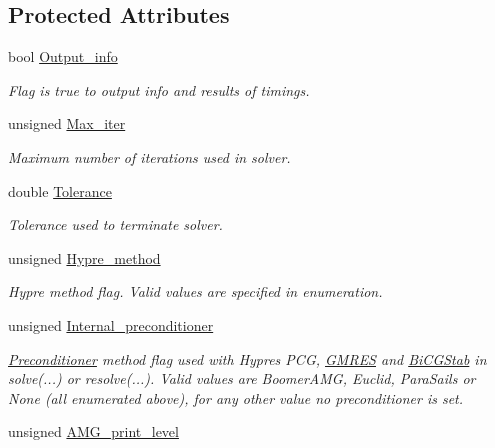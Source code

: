 \subsection*{Protected Attributes}
\begin{DoxyCompactItemize}
\item 
bool \hyperlink{classoomph_1_1HypreInterface_a011667f822e82fc40fde8ab5f2bd4d57}{Output\+\_\+info}
\begin{DoxyCompactList}\small\item\em Flag is true to output info and results of timings. \end{DoxyCompactList}\item 
unsigned \hyperlink{classoomph_1_1HypreInterface_abca9f624ee43955c6607a62b50128614}{Max\+\_\+iter}
\begin{DoxyCompactList}\small\item\em Maximum number of iterations used in solver. \end{DoxyCompactList}\item 
double \hyperlink{classoomph_1_1HypreInterface_aa32a993d324c6b198726064299a4e924}{Tolerance}
\begin{DoxyCompactList}\small\item\em Tolerance used to terminate solver. \end{DoxyCompactList}\item 
unsigned \hyperlink{classoomph_1_1HypreInterface_ae2a79282191b4430ef6631df9fc8c947}{Hypre\+\_\+method}
\begin{DoxyCompactList}\small\item\em Hypre method flag. Valid values are specified in enumeration. \end{DoxyCompactList}\item 
unsigned \hyperlink{classoomph_1_1HypreInterface_a5694f23f49b16ca978e6bcb629c7ab27}{Internal\+\_\+preconditioner}
\begin{DoxyCompactList}\small\item\em \hyperlink{classoomph_1_1Preconditioner}{Preconditioner} method flag used with Hypre\textquotesingle{}s P\+CG, \hyperlink{classoomph_1_1GMRES}{G\+M\+R\+ES} and \hyperlink{classoomph_1_1BiCGStab}{Bi\+C\+G\+Stab} in solve(...) or resolve(...). Valid values are Boomer\+A\+MG, Euclid, Para\+Sails or None (all enumerated above), for any other value no preconditioner is set. \end{DoxyCompactList}\item 
unsigned \hyperlink{classoomph_1_1HypreInterface_ad1e2b0066abfccd0c489227c208c0f74}{A\+M\+G\+\_\+print\+\_\+level}

\end{DoxyCompactItemize}

